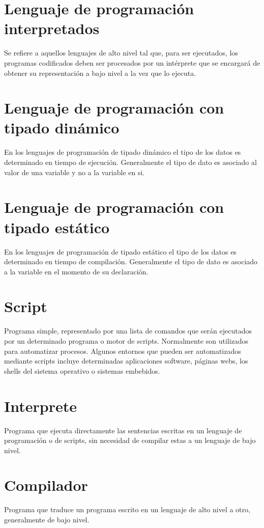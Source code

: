 \section{Lenguaje de programación interpretados}
Se refiere a aquellos lenguajes de alto nivel tal que, para ser ejecutados, los programas codificados deben ser procesados por un intérprete que 
se encargará de obtener su representación a bajo nivel a la vez que lo ejecuta.

\section{Lenguaje de programación con tipado dinámico}
En los lenguajes de programación de tipado dinámico el tipo de los datos es determinado en tiempo de ejecución. Generalmente el tipo de dato es asociado 
al valor de una variable y no a la variable en si. 
 
\section{Lenguaje de programación con tipado estático}
En los lenguajes de programación de tipado estático el tipo de los datos es determinado en tiempo de compilación. Generalmente el tipo de dato es asociado 
a la variable en el momento de su declaración.  

\section{Script}
Programa simple, representado por una lista de comandos que serán ejecutados por un determinado programa o motor de scripts. Normalmente son utilizados
para automatizar procesos. Algunos entornos que pueden ser automatizados mediante scripts incluye 
determinadas aplicaciones software, páginas webs, los shells del sistema operativo o sistemas embebidos.

\section{Interprete}
Programa que ejecuta directamente las sentencias escritas en un lenguaje de programación o de scripts, sin necesidad de compilar estas a un lenguaje de 
bajo nivel. 

\section{Compilador}
Programa que traduce un programa escrito en un lenguaje de alto nivel a otro, generalmente de bajo nivel.  

